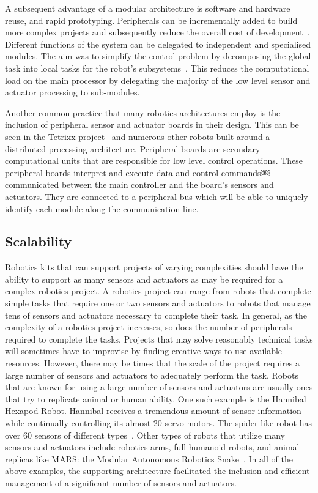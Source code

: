 A subsequent advantage of a modular architecture is software and hardware reuse, and rapid prototyping. Peripherals can be incrementally added to build more complex projects and subsequently reduce the overall cost of development~\parencite{modcom}. Different functions of the system can be delegated to independent and specialised modules. The aim was to simplify the control problem by decomposing the global task into local tasks for the robot's subsystems~\parencite{rdk}. This reduces the computational load on the main processor by delegating the majority of the low level sensor and actuator processing to sub-modules. 

Another common practice that many robotics architectures employ is the inclusion of peripheral sensor and actuator boards in their design. This can be seen in the Tetrixx project~\parencite{tetrixx} and numerous other robots built around a distributed processing architecture. Peripheral boards are secondary computational units that are responsible for low level control operations. These peripheral boards interpret and execute data and control commands￼communicated between the main controller and the board's sensors and actuators. They are connected to a peripheral bus which will be able to uniquely identify each module along the communication line. 

 

\subsection{Scalability} %
\label{sub:scalability}
Robotics kits that can support projects of varying complexities should have the ability to support as many sensors and actuators as may be required for a complex robotics project. A robotics project can range from robots that complete simple tasks that require one or two sensors and actuators to robots that manage tens of sensors and actuators necessary to complete their task. In general, as the complexity of a robotics project increases, so does the number of peripherals required to complete the tasks. Projects that may solve reasonably technical tasks will sometimes have to improvise by finding creative ways to use available resources. However, there may be times that the scale of the project requires a large number of sensors and actuators to adequately perform the task. Robots that are known for using a large number of sensors and actuators are usually ones that try to replicate animal or human ability. One such example is the Hannibal Hexapod Robot. Hannibal receives a tremendous amount of sensor  information while continually controlling its almost 20 servo motors.  The spider-like robot has over 60 sensors of different types~\parencite{hannibal}. Other types of robots that utilize many sensors and actuators include robotics arms, full humanoid robots, and animal replicas like MARS: the Modular  Autonomous Robotics Snake~\parencite{mars}. In all of the above examples, the supporting architecture facilitated the inclusion and efficient management of a significant number of sensors and actuators.

